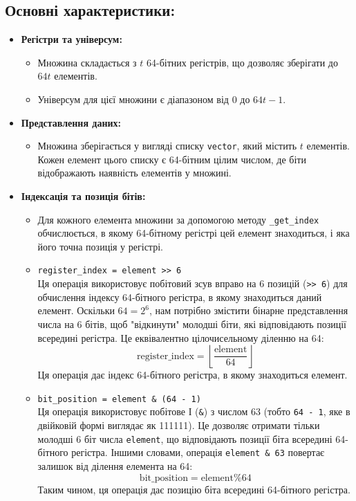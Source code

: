 \documentclass[a4paper,12pt]{article}
\begin{document}
\subsection{Основні характеристики:}
\begin{itemize}
    \item \textbf{Регістри та універсум:}
    \begin{itemize}
        \item Множина складається з $t$ 64-бітних регістрів, що дозволяє зберігати до $64t$ елементів.
        \item Універсум для цієї множини є діапазоном від $0$ до $64t - 1$.
    \end{itemize}
    \item \textbf{Представлення даних:}
    \begin{itemize}
        \item Множина зберігається у вигляді списку \texttt{vector}, який містить $t$ елементів. Кожен елемент цього списку є 64-бітним цілим числом, де біти відображають наявність елементів у множині.
    \end{itemize}
    \item \textbf{Індексація та позиція бітів:}
    \begin{itemize}
        \item Для кожного елемента множини за допомогою методу \texttt{\_get\_index} обчислюється, в якому 64-бітному регістрі цей елемент знаходиться, і яка його точна позиція у регістрі.
        \item \texttt{register\_index = element >> 6} \\
        Ця операція використовує побітовий зсув вправо на 6 позицій (\texttt{>> 6}) для обчислення індексу 64-бітного регістра, в якому знаходиться даний елемент. Оскільки $64 = 2^6$, нам потрібно змістити бінарне представлення числа на 6 бітів, щоб "відкинути" молодші біти, які відповідають позиції всередині регістра. Це еквівалентно цілочисельному діленню на 64:
        \[
        \text{register\_index} = \left\lfloor \frac{\text{element}}{64} \right\rfloor
        \]
        Ця операція дає індекс 64-бітного регістра, в якому знаходиться елемент.
        
        \item \texttt{bit\_position = element \& (64 - 1)} \\
        Ця операція використовує побітове І (\texttt{\&}) з числом $63$ (тобто \texttt{64 - 1}, яке в двійковій формі виглядає як 111111). Це дозволяє отримати тільки молодші 6 біт числа \texttt{element}, що відповідають позиції біта всередині 64-бітного регістра. Іншими словами, операція \texttt{element \& 63} повертає залишок від ділення елемента на 64:
        \[
        \text{bit\_position} = \text{element} \% 64
        \]
        Таким чином, ця операція дає позицію біта всередині 64-бітного регістра.
    \end{itemize}
\end{itemize}
\end{document}
